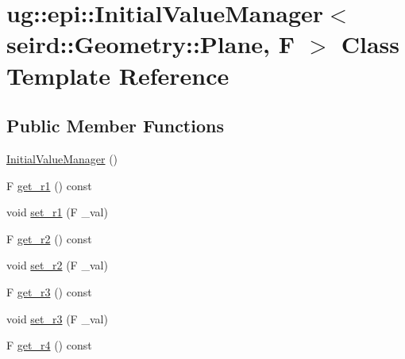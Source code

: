 \hypertarget{classug_1_1epi_1_1_initial_value_manager_3_01seird_1_1_geometry_1_1_plane_00_01_f_01_4}{}\section{ug\+:\+:epi\+:\+:Initial\+Value\+Manager$<$ seird\+:\+:Geometry\+:\+:Plane, F $>$ Class Template Reference}
\label{classug_1_1epi_1_1_initial_value_manager_3_01seird_1_1_geometry_1_1_plane_00_01_f_01_4}
\subsection*{Public Member Functions}
\begin{DoxyCompactItemize}
\item 
\hyperlink{classug_1_1epi_1_1_initial_value_manager_3_01seird_1_1_geometry_1_1_plane_00_01_f_01_4_a48afe4054e08a2babc0c647c82b9acc8}{Initial\+Value\+Manager} ()
\item 
F \hyperlink{classug_1_1epi_1_1_initial_value_manager_3_01seird_1_1_geometry_1_1_plane_00_01_f_01_4_a5b9f31f7f9372c451cb7e101784b09f6}{get\+\_\+r1} () const
\item 
void \hyperlink{classug_1_1epi_1_1_initial_value_manager_3_01seird_1_1_geometry_1_1_plane_00_01_f_01_4_afd6ad1544c46275b52f3a550bc7f149c}{set\+\_\+r1} (F \+\_\+val)
\item 
F \hyperlink{classug_1_1epi_1_1_initial_value_manager_3_01seird_1_1_geometry_1_1_plane_00_01_f_01_4_a8e44064e6f2562304c3cd9bb86831387}{get\+\_\+r2} () const
\item 
void \hyperlink{classug_1_1epi_1_1_initial_value_manager_3_01seird_1_1_geometry_1_1_plane_00_01_f_01_4_ab00efa1679fc309b894d53a03ec55e5f}{set\+\_\+r2} (F \+\_\+val)
\item 
F \hyperlink{classug_1_1epi_1_1_initial_value_manager_3_01seird_1_1_geometry_1_1_plane_00_01_f_01_4_a2840262a31a976f587fda8a972324dc6}{get\+\_\+r3} () const
\item 
void \hyperlink{classug_1_1epi_1_1_initial_value_manager_3_01seird_1_1_geometry_1_1_plane_00_01_f_01_4_a3f80dd792acd8571a9a0ad141d591b46}{set\+\_\+r3} (F \+\_\+val)
\item 
F \hyperlink{classug_1_1epi_1_1_initial_value_manager_3_01seird_1_1_geometry_1_1_plane_00_01_f_01_4_a6b180be19269c94294291de2ea3dd908}{get\+\_\+r4} () const
\item 

\end{DoxyCompactItemize}
